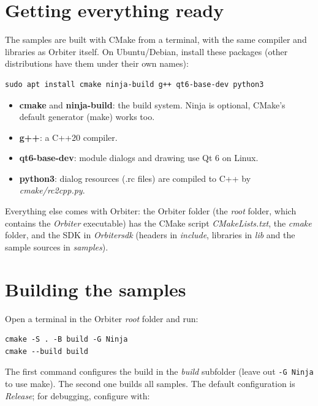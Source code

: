 \documentclass[a4paper]{article}
\begin{document}
\maketitle

\section{Getting everything ready}
The samples are built with CMake from a terminal, with the same compiler and libraries as Orbiter itself. On Ubuntu/Debian, install these packages (other distributions have them under their own names):

\begin{verbatim}
sudo apt install cmake ninja-build g++ qt6-base-dev python3
\end{verbatim}

\begin{itemize}
\item \textbf{cmake} and \textbf{ninja-build}: the build system. Ninja is optional, CMake's default generator (make) works too.
\item \textbf{g++}: a C++20 compiler.
\item \textbf{qt6-base-dev}: module dialogs and drawing use Qt 6 on Linux.
\item \textbf{python3}: dialog resources (.rc files) are compiled to C++ by \textit{cmake/rc2cpp.py}.
\end{itemize}

Everything else comes with Orbiter: the Orbiter folder (the \textit{root} folder, which contains the \textit{Orbiter} executable) has the CMake script \textit{CMakeLists.txt}, the \textit{cmake} folder, and the SDK in \textit{Orbitersdk} (headers in \textit{include}, libraries in \textit{lib} and the sample sources in \textit{samples}).

\section{Building the samples}
Open a terminal in the Orbiter \textit{root} folder and run:

\begin{verbatim}
cmake -S . -B build -G Ninja
cmake --build build
\end{verbatim}

The first command configures the build in the \textit{build} subfolder (leave out \texttt{-G Ninja} to use make). The second one builds all samples. The default configuration is \textit{Release}; for debugging, configure with:
\end{document}
